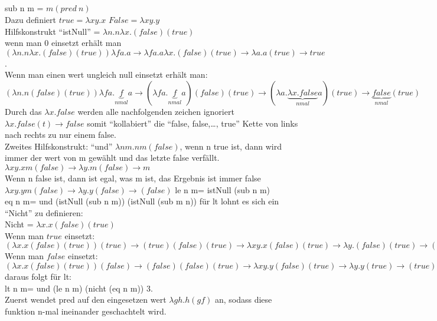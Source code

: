 \documentclass{article}
\begin{document}
	\subsection{}
	sub n m = $m (pred\ n)$\\
	Dazu definiert $true = \lambda xy.x$ $False = \lambda xy.y$\\
	Hilfskonstrukt ``istNull'' = $\lambda n.n\lambda x.(false) (true)$\\
	wenn man 0 einsetzt erhält man $(\lambda n.n\lambda x.(false) (true)) \lambda f a.a\to \lambda f a.a \lambda x.(false) (true) \to\lambda a.a (true)\to true$.\\
	Wenn man einen wert ungleich null einsetzt erhält man:\\
	$(\lambda n.n(false) (true)) \lambda f a.\underbrace{f}_{n mal} a \to (\lambda f a.\underbrace{f}_{n mal} a) (false) (true) \to (\lambda a.\underbrace{\lambda x.false}_{n mal} a) (true) \to \underbrace{false}_{n mal} (true)$\\
	Durch das $\lambda x.false$ werden alle nachfolgenden zeichen ignoriert $\lambda x.false (t)\to false$ somit ``kollabiert'' die ``false, false,\dots, true'' Kette von links nach rechts zu nur einem false.\\
	Zweites Hilfskonstrukt: ``und'' $ \lambda nm. n m (false)$, wenn n true ist, dann wird immer der wert von m gewählt und das letzte false verfällt. $\lambda xy.x m (false)\to \lambda y.m (false)\to m$\\
	Wenn n false ist, dann ist egal, was m ist, das Ergebnis ist immer false $\lambda xy.y m (false)\to \lambda y.y (false)\to (false)$
	le n m= istNull (sub n m)\\
	eq n m= und (istNull (sub n m)) (istNull (sub m n))
	für lt lohnt es sich ein ``Nicht'' zu definieren:\\
	Nicht = $\lambda x.x (false) (true) $ \\
	Wenn man $true$ einsetzt: $(\lambda x. x (false) (true)) (true)\to (true) (false) (true) \to \lambda xy.x (false) (true)\to \lambda y.(false) (true)\to (false)$\\
	Wenn man $false$ einsetzt: $(\lambda x. x (false) (true)) (false)\to (false) (false) (true) \to \lambda xy.y (false) (true) \to \lambda y.y (true) \to (true)$\\
	daraus folgt für lt:\\
	lt n m= und (le n m) (nicht (eq n m))
	3.\\
	Zuerst wendet pred auf den eingesetzen wert $\lambda gh.h(gf)$ an, sodass diese funktion n-mal ineinander geschachtelt wird.\\
\end{document}
